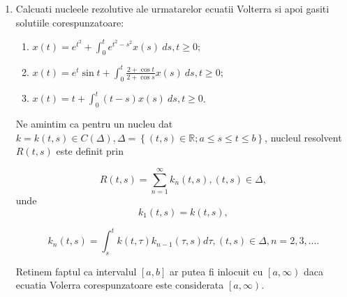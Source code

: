 \documentclass[a4paper,12pt,oneside]{report}
\begin{document}
	\begin{enumerate}
		\item Calcuati nucleele rezolutive ale urmatarelor ecuatii Volterra si apoi gasiti solutiile corespunzatoare:
		      \begin{enumerate}[label=(\alph*)]
		      	\item \(x\left ( t \right ) = e^{t^{2}} + \int_{0}^{t}e^{t^{2} - s^{2}}x\left ( s \right )\ ds , t\geq 0;\)
		      	\item \(x\left ( t \right ) = e^{t} \sin t+ \int_{0}^{t}\frac{2 + \cos t}{2+ \cos s}x\left ( s \right )\ ds , t\geq 0;\)
		      	\item \(x\left ( t \right ) =  t+ \int_{0}^{t}\left ( t-s \right )x\left ( s \right )\ ds , t\geq 0\).
		      \end{enumerate}
		      		      		      		      		          
		      Ne amintim ca pentru un nucleu dat \(k = k\left ( t,s \right ) \in C\left ( \Delta  \right ), \Delta = \left \{ \left ( t,s \right ) \in \mathbb{R}; a\leq s\leq t\leq b \right \}\), nucleul resolvent \(R \left ( t,s \right )\) este definit prin 
		      		      		      		      		      
		      \begin{displaymath}
		      	R \left ( t,s \right ) = \sum_{n = 1}^{\infty } k_{n}\left ( t,s \right ), \left ( t,s \right ) \in \Delta,
		      \end{displaymath} 
		      unde
		      \begin{displaymath}
		      	k_{1}\left ( t,s \right ) = k\left ( t,s \right ),
		      \end{displaymath}
		      		      		      		      		      
		      \begin{displaymath}
		      	k_{n}\left ( t,s \right ) = \int_{s}^{t}k\left ( t,\tau  \right )k_{n-1}\left ( \tau ,s \right )d\tau , \left ( t,s \right ) \in \Delta , n = 2,3,....
		      \end{displaymath}
		      		      		      		      		      
		      Retinem faptul ca intervalul \(\left [ a,b \right ]\) ar putea fi inlocuit cu \(\left [ a,\infty  \right )\) daca ecuatia Volerra corespunzatoare este considerata \(\left [ a,\infty  \right )\). 
		      			      			      			      			      	

\end{enumerate}
\end{document}
